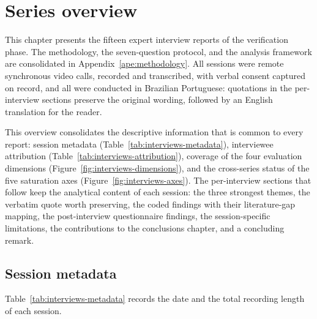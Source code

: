 
\section{Series overview}
\label{sec:interviews-overview}

This chapter presents the fifteen expert interview reports of the verification phase. The methodology, the seven-question protocol, and the analysis framework are consolidated in Appendix~\ref{ape:methodology}. All sessions were remote synchronous video calls, recorded and transcribed, with verbal consent captured on record, and all were conducted in Brazilian Portuguese: quotations in the per-interview sections preserve the original wording, followed by an English translation for the reader.

This overview consolidates the descriptive information that is common to every report: session metadata (Table~\ref{tab:interviews-metadata}), interviewee attribution (Table~\ref{tab:interviews-attribution}), coverage of the four evaluation dimensions (Figure~\ref{fig:interviews-dimensions}), and the cross-series status of the five saturation axes (Figure~\ref{fig:interviews-axes}). The per-interview sections that follow keep the analytical content of each session: the three strongest themes, the verbatim quote worth preserving, the coded findings with their literature-gap mapping, the post-interview questionnaire findings, the session-specific limitations, the contributions to the conclusions chapter, and a concluding remark.

\subsection*{Session metadata}

Table~\ref{tab:interviews-metadata} records the date and the total recording length of each session.

